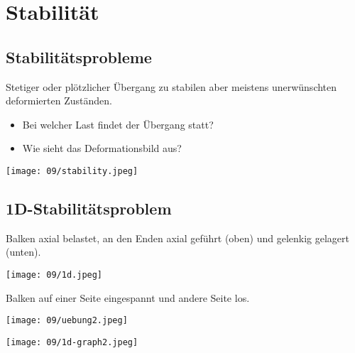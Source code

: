 \section{Stabilität}
    \subsection{Stabilitätsprobleme}
        Stetiger oder plötzlicher Übergang zu stabilen aber meistens unerwünschten deformierten Zuständen.\vspace{-1mm}
        \begin{itemize}
            \item Bei welcher Last findet der Übergang statt?
            \item Wie sieht das Deformationsbild aus?
        \end{itemize}
        \begin{center}
            \texttt{[image: 09/stability.jpeg]}
        \end{center}
    \subsection{1D-Stabilitätsproblem}
        Balken axial belastet, an den Enden axial geführt (oben) und gelenkig gelagert (unten).
        \vspace{-2mm}
        \begin{center}
            \texttt{[image: 09/1d.jpeg]}
        \end{center}
        \vspace{-3mm}
        Balken auf einer Seite eingespannt und andere Seite los.
        \begin{center}
            \texttt{[image: 09/uebung2.jpeg]}
        \end{center}
        \begin{center}
             \texttt{[image: 09/1d-graph2.jpeg]}
        \end{center}
        
        \begin{comment}
        \subsubsection{Plastifizieren vor Knicken}
            $P_{plast} \leqslant P_k $
        \end{comment}
